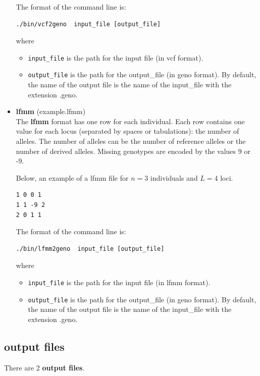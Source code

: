 \documentclass[10pt,a4paper]{article}
\begin{document}
\begin{itemize}
The format of the command line is:
\begin{Verbatim}[frame=single]
./bin/vcf2geno  input_file [output_file]
\end{Verbatim}
where 
\begin{itemize}
\item \verb|input_file| is the path for the input file (in vcf format).
\item \verb|output_file| is the path for the output\_file (in geno format). 
By default, the name of the output file is the name of the input\_file with the extension .geno.
\end{itemize}

\item {\bf lfmm} (example.lfmm)\\
The {\bf lfmm} format has one row for each individual. Each row contains one value for each locus (separated by spaces or tabulations): the number of alleles. The number of alleles can be the number of reference alleles or the number of derived alleles. Missing genotypes are encoded by the values 9 or -9. 


Below, an example of a lfmm file for $n=3$ individuals and $L=4$ loci.
\begin{center}
\footnotesize
\begin{Verbatim}[frame=single]
1 0 0 1
1 1 -9 2
2 0 1 1
\end{Verbatim}
\end{center}

The format of the command line is:
\begin{Verbatim}[frame=single]
./bin/lfmm2geno  input_file [output_file]
\end{Verbatim}
where 
\begin{itemize}
\item \verb|input_file| is the path for the input file (in lfmm format).
\item \verb|output_file| is the path for the output\_file (in geno format). 
By default, the name of the output file is the name of the input\_file with the extension .geno.
\end{itemize}

\end{itemize}

\subsection{output files}
\noindent
There are 2 {\bf output files}.
\end{document}
